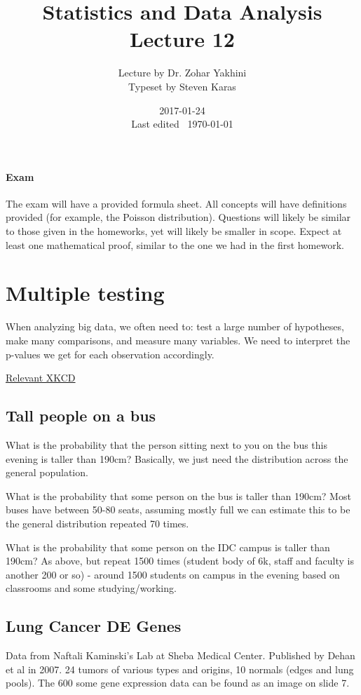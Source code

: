 \documentclass[a4paper]{article}
\title{Statistics and Data Analysis\\\large Lecture 12}
\date{2017-01-24 \\ Last edited \currenttime\ \today}
\author{Lecture by Dr. Zohar Yakhini\\Typeset by Steven Karas}
\begin{document}
\maketitle

\paragraph{Exam}
The exam will have a provided formula sheet.
All concepts will have definitions provided (for example, the Poisson distribution).
Questions will likely be similar to those given in the homeworks, yet will likely be smaller in scope.
Expect at least one mathematical proof, similar to the one we had in the first homework.


\section{Multiple testing}
When analyzing big data, we often need to: test a large number of hypotheses, make many comparisons, and measure many variables.
We need to interpret the p-values we get for each observation accordingly.

\href{https://xkcd.com/882/}{Relevant XKCD}

\subsection{Tall people on a bus}
What is the probability that the person sitting next to you on the bus this evening is taller than 190cm?
Basically, we just need the distribution across the general population.

What is the probability that some person on the bus is taller than 190cm?
Most buses have between 50-80 seats, assuming mostly full we can estimate this to be the general distribution repeated 70 times.

What is the probability that some person on the IDC campus is taller than 190cm?
As above, but repeat 1500 times (student body of 6k, staff and faculty is another 200 or so) - around 1500 students on campus in the evening based on classrooms and some studying/working.

\subsection{Lung Cancer DE Genes}
Data from Naftali Kaminski's Lab at Sheba Medical Center.
Published by Dehan et al in 2007.
24 tumors of various types and origins, 10 normals (edges and lung pools).
The 600 some gene expression data can be found as an image on slide 7.
\end{document}
